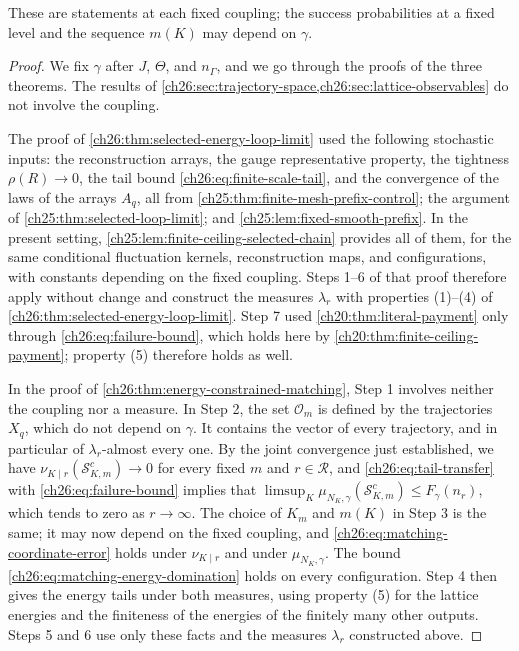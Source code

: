 These are statements at each fixed coupling; the success probabilities at a fixed level and the sequence $m(K)$ may depend on $\gamma$.

\begin{proof}
We fix $\gamma$ after $J$, $\Theta$, and $n_\Gamma$, and we go through the proofs of the three theorems. The results of \cref{ch26:sec:trajectory-space,ch26:sec:lattice-observables} do not involve the coupling.

The proof of \cref{ch26:thm:selected-energy-loop-limit} used the following stochastic inputs: the reconstruction arrays, the gauge representative property, the tightness $\rho(R)\to0$, the tail bound \eqref{ch26:eq:finite-scale-tail}, and the convergence of the laws of the arrays $A_q$, all from \cref{ch25:thm:finite-mesh-prefix-control}; the argument of \cref{ch25:thm:selected-loop-limit}; and \cref{ch25:lem:fixed-smooth-prefix}. In the present setting, \cref{ch25:lem:finite-ceiling-selected-chain} provides all of them, for the same conditional fluctuation kernels, reconstruction maps, and configurations, with constants depending on the fixed coupling. Steps 1--6 of that proof therefore apply without change and construct the measures $\lambda_r$ with properties (1)--(4) of \cref{ch26:thm:selected-energy-loop-limit}. Step 7 used \cref{ch20:thm:literal-payment} only through \eqref{ch26:eq:failure-bound}, which holds here by \cref{ch20:thm:finite-ceiling-payment}; property (5) therefore holds as well.

In the proof of \cref{ch26:thm:energy-constrained-matching}, Step 1 involves neither the coupling nor a measure. In Step 2, the set $\mathcal O_m$ is defined by the trajectories $X_q$, which do not depend on $\gamma$. It contains the vector of every trajectory, and in particular of $\lambda_r$-almost every one. By the joint convergence just established, we have $\nu_{K\mid r}(\mathcal S^c_{K,m})\to0$ for every fixed $m$ and $r\in\mathcal R$, and \eqref{ch26:eq:tail-transfer} with \eqref{ch26:eq:failure-bound} implies that $\limsup_K\mu_{N_K,\gamma}(\mathcal S^c_{K,m})\le F_\gamma(n_r)$, which tends to zero as $r\to\infty$. The choice of $K_m$ and $m(K)$ in Step 3 is the same; it may now depend on the fixed coupling, and \eqref{ch26:eq:matching-coordinate-error} holds under $\nu_{K\mid r}$ and under $\mu_{N_K,\gamma}$. The bound \eqref{ch26:eq:matching-energy-domination} holds on every configuration. Step 4 then gives the energy tails under both measures, using property (5) for the lattice energies and the finiteness of the energies of the finitely many other outputs. Steps 5 and 6 use only these facts and the measures $\lambda_r$ constructed above.


\end{proof}
